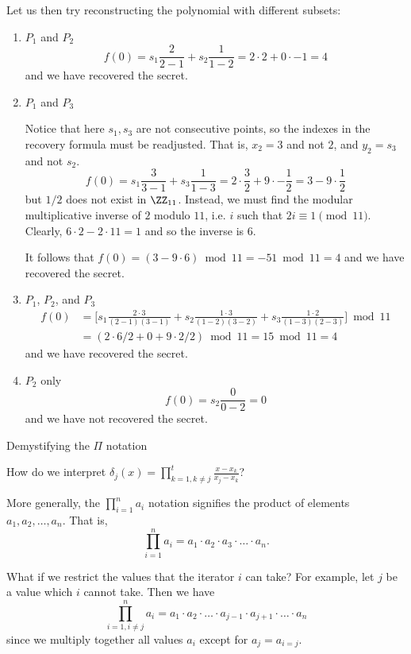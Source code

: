 \documentclass[parskip=half]{scrartcl}
\begin{document}
Let us then try reconstructing the polynomial with different subsets:
\begin{enumerate}
  \item $P_1$ and $P_2$
  \[
    f(0) = s_1 \frac{2}{2-1} + s_2 \frac{1}{1-2} =
    2 \cdot 2 + 0 \cdot -1 = 4
  \]
  and we have recovered the secret.

  \item $P_1$ and $P_3$
  
  Notice that here $s_1, s_3$ are not consecutive points, so the indexes in the recovery formula must be readjusted.
  That is, $x_2 = 3$ and not $2$, and $y_2 = s_3$ and not $s_2$.
  \[
    f(0) = s_1 \frac{3}{3-1} + s_3 \frac{1}{1-3} =
    2 \cdot \frac{3}{2} + 9 \cdot -\frac{1}{2} = 3 - 9 \cdot \frac{1}{2}
  \]
  but $1/2$ does not exist in $\ZZ_{11}$.
  Instead, we must find the modular multiplicative inverse of $2$ modulo $11$, i.e. $i$ such that $2i \equiv 1 \pmod{11}$.
  Clearly, $6 \cdot 2 - 2\cdot 11 = 1$ and so the inverse is $6$.

  It follows that
  $f(0) = (3 - 9\cdot 6) \bmod{11} = -51 \bmod{11} = 4$
  and we have recovered the secret.

  \item $P_1$, $P_2$, and $P_3$
  \begin{align*}
    f(0) &= \Biggl[s_1 \frac{2 \cdot 3}{(2-1)(3-1)} + s_2 \frac{1 \cdot 3}{(1-2)(3-2)} + s_3\frac{1 \cdot 2}{(1-3)(2-3)}\Biggr]\bmod{11}\\
    &= (2 \cdot 6/2 + 0 + 9 \cdot 2/2) \bmod{11} = 15 \bmod{11} = 4
  \end{align*}
  and we have recovered the secret.

  \item $P_2$ only
  \[
    f(0) = s_2 \frac{0}{0 - 2} = 0
  \]
  and we have not recovered the secret.
\end{enumerate}

\newpage

\begin{center}
  Demystifying the $\Pi$ notation
\end{center}

How do we interpret $\delta_j(x)=\prod_{k=1,k\neq j}^{t}\frac{x-x_k}{x_j-x_k}$?

More generally, the $\prod_{i = 1}^n a_i$ notation signifies the product of elements $a_1, a_2, \dots, a_n$.
That is,
\[
  \prod_{i = 1}^n a_i = a_1 \cdot a_2 \cdot a_3 \cdot \ldots \cdot a_n.
\]

What if we restrict the values that the iterator $i$ can take?
For example, let $j$ be a value which $i$ cannot take.
Then we have
\[
  \prod_{i = 1, i \neq j}^n a_i = a_1 \cdot a_2 \cdot \ldots \cdot a_{j-1} \cdot a_{j+1} \cdot \ldots \cdot a_n
\]
since we multiply together all values $a_i$ except for $a_j = a_{i = j}$.
\end{document}

